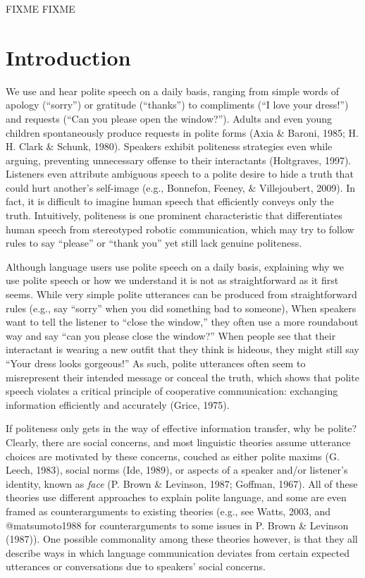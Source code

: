 \documentclass[oneside]{report}
\begin{document}
FIXME
FIXME

\afterpreface


\chapter*{Introduction}\label{intro}

We use and hear polite speech on a daily basis, ranging from simple
words of apology (``sorry'') or gratitude (``thanks'') to compliments
(``I love your dress!'') and requests (``Can you please open the
window?''). Adults and even young children spontaneously produce
requests in polite forms (Axia \& Baroni, 1985; H. H. Clark \& Schunk,
1980). Speakers exhibit politeness strategies even while arguing,
preventing unnecessary offense to their interactants (Holtgraves, 1997).
Listeners even attribute ambiguous speech to a polite desire to hide a
truth that could hurt another's self-image (e.g., Bonnefon, Feeney, \&
Villejoubert, 2009). In fact, it is difficult to imagine human speech
that efficiently conveys only the truth. Intuitively, politeness is one
prominent characteristic that differentiates human speech from
stereotyped robotic communication, which may try to follow rules to say
``please'' or ``thank you'' yet still lack genuine politeness.

Although language users use polite speech on a daily basis, explaining
why we use polite speech or how we understand it is not as
straightforward as it first seems. While very simple polite utterances
can be produced from straightforward rules (e.g., say ``sorry'' when you
did something bad to someone), When speakers want to tell the listener
to ``close the window,'' they often use a more roundabout way and say
``can you please close the window?'' When people see that their
interactant is wearing a new outfit that they think is hideous, they
might still say ``Your dress looks gorgeous!'' As such, polite
utterances often seem to misrepresent their intended message or conceal
the truth, which shows that polite speech violates a critical principle
of cooperative communication: exchanging information efficiently and
accurately (Grice, 1975).

If politeness only gets in the way of effective information transfer,
why be polite? Clearly, there are social concerns, and most linguistic
theories assume utterance choices are motivated by these concerns,
couched as either polite maxims (G. Leech, 1983), social norms (Ide,
1989), or aspects of a speaker and/or listener's identity, known as
\emph{face} (P. Brown \& Levinson, 1987; Goffman, 1967). All of these
theories use different approaches to explain polite language, and some
are even framed as counterarguments to existing theories (e.g., see
Watts, 2003, and @matsumoto1988 for counterarguments to some issues in
P. Brown \& Levinson (1987)). One possible commonality among these
theories however, is that they all describe ways in which language
communication deviates from certain expected utterances or conversations
due to speakers' social concerns.
\end{document}
